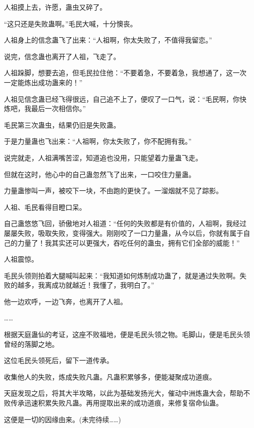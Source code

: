 \begin{this_body}
人祖摸上去，许愿，蛊虫又碎了。

“这只还是失败蛊啊。”毛民大喊，十分懊丧。

人祖身上的信念蛊飞了出来：“人祖啊，你太失败了，不值得我留恋。”

说完，信念蛊也离开了人祖，飞走了。

人祖跺脚，想要去追，但毛民拉住他：“不要着急，不要着急，我想通了，这一次一定能炼出成功蛊来的！”

人祖见信念蛊已经飞得很远，自己追不上了，便叹了一口气，说：“毛民啊，你快炼吧，我最后一次相信你。”

毛民第三次蛊虫，结果仍旧是失败蛊。

于是力量蛊也飞出来：“人祖啊，你太失败了，你不配拥有我。”

说完就走，人祖满嘴苦涩，知道追也没用，只能望着力量蛊飞走。

但就在这时，他心中的自己蛊忽然飞了出来，一口咬住力量蛊。

力量蛊惨叫一声，被咬下一块，不由跑的更快了。一溜烟就不见了踪影。

人祖、毛民看得目瞪口呆。

自己蛊悠悠飞回，骄傲地对人祖道：“任何的失败都是有价值的，人祖啊，我经过屡屡失败，吸取失败，变得强大。刚刚咬了一口力量蛊，从今以后，你就有属于自己的力量了！我其实还可以更强大，吞吃任何的蛊虫，拥有它们全部的威能！”

人祖震惊。

毛民头领则拍着大腿喊叫起来：“我知道如何炼制成功蛊了，就是通过失败啊。失败的越多，我离成功就越近！我懂了，我明白了。”

他一边欢呼，一边飞奔，也离开了人祖。

……

根据天庭蛊仙的考证，这座不败福地，便是毛民头领之物。毛脚山，便是毛民头领曾经的落脚之地。

这位毛民头领死后，留下一道传承。

收集他人的失败，炼成失败凡蛊。凡蛊积累够多，便能凝聚成功道痕。

天庭发现之后，将其大半攻略，以此为基础发扬光大，催动中洲炼蛊大会，帮助不败传承迅速积累失败凡蛊。再用提取出来的成功道痕，来修复宿命仙蛊。

这便是一切的因缘由来。(未完待续……)

\end{this_body}

